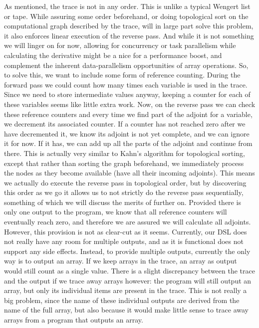     As mentioned, the trace is not in any order.
    This is unlike a typical Wengert list or tape.
    While assuring some order beforehand, or doing topological sort on the computational graph described by the trace, will in large part solve this problem, it also enforces linear execution of the reverse pass.
    And while it is not something we will linger on for now, allowing for concurrency or task parallelism while calculating the derivative might be a nice for a performance boost, and complement the inherent data-parallelism opportunities of array operations.
    So, to solve this, we want to include some form of reference counting.
    During the forward pass we could count how many times each variable is used in the trace.
    Since we need to store intermediate values anyway, keeping a counter for each of these variables seems like little extra work.
    Now, on the reverse pass we can check these reference counters and every time we find part of the adjoint for a variable, we decrement its associated counter.
    If a counter has not reached zero after we have decremented it, we know its adjoint is not yet complete, and we can ignore it for now.
    If it has, we can add up all the parts of the adjoint and continue from there.
    This is actually very similar to Kahn's algorithm for topological sorting\cite{kahn1962topological}, except that rather than sorting the graph beforehand, we immediately process the nodes as they become available (have all their incoming adjoints).
    This means we actually do execute the reverse pass in topological order, but by discovering this order as we go it allows us to not strictly do the reverse pass sequentially, something of which we will discuss the merits of further on.
    Provided there is only one output to the program, we know that all reference counters will eventually reach zero, and therefore we are assured we will calculate all adjoints.
    However, this provision is not as clear-cut as it seems.
    Currently, our DSL does not really have any room for multiple outputs, and as it is functional does not support any side effects.
    Instead, to provide multiple outputs, currently the only way is to output an array.
    If we keep arrays in the trace, an array as output would still count as a single value.
    There is a slight discrepancy between the trace and the output if we trace away arrays however: the program will still output an array, but only its individual items are present in the trace.
    This is not really a big problem, since the name of these individual outputs are derived from the name of the full array, but also because it would make little sense to trace away arrays from a program that outputs an array.

